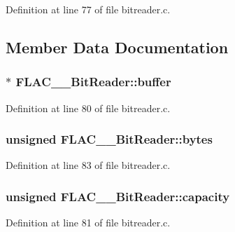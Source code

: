 Definition at line 77 of file bitreader.\+c.



\subsection{Member Data Documentation}
\subsubsection[{\texorpdfstring{buffer}{buffer}}]{$\ast$ F\+L\+A\+C\+\_\+\+\_\+\+Bit\+Reader\+::buffer}\hypertarget{struct_f_l_a_c_____bit_reader_a12eadf61501c9ad763b8ef3c6ec0cda7}{}\label{struct_f_l_a_c_____bit_reader_a12eadf61501c9ad763b8ef3c6ec0cda7}


Definition at line 80 of file bitreader.\+c.

\subsubsection[{\texorpdfstring{bytes}{bytes}}]{\setlength{\rightskip}{0pt plus 5cm}unsigned F\+L\+A\+C\+\_\+\+\_\+\+Bit\+Reader\+::bytes}\hypertarget{struct_f_l_a_c_____bit_reader_a0d45dadb4f3236aabfb9174b436b27e9}{}\label{struct_f_l_a_c_____bit_reader_a0d45dadb4f3236aabfb9174b436b27e9}


Definition at line 83 of file bitreader.\+c.

\subsubsection[{\texorpdfstring{capacity}{capacity}}]{\setlength{\rightskip}{0pt plus 5cm}unsigned F\+L\+A\+C\+\_\+\+\_\+\+Bit\+Reader\+::capacity}\hypertarget{struct_f_l_a_c_____bit_reader_af69ebfd4017982d3bef49d4081ce3476}{}\label{struct_f_l_a_c_____bit_reader_af69ebfd4017982d3bef49d4081ce3476}


Definition at line 81 of file bitreader.\+c.


